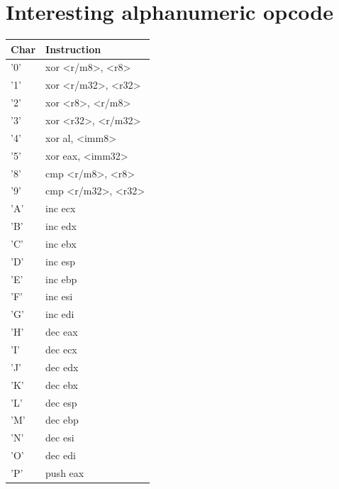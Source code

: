 \documentclass[14pt]{article}
\begin{document}
\section{Interesting alphanumeric opcode}
\center
\begin{tabular}{l|l|}
    Char & Instruction\\
    \hline
    '0' & xor <r/m8>, <r8>\\
    '1' & xor <r/m32>, <r32>\\
    '2' & xor <r8>, <r/m8>\\
    '3' & xor <r32>, <r/m32>\\
    '4' & xor al, <imm8>\\
    '5' & xor eax, <imm32>\\
    '8' & cmp <r/m8>, <r8>\\
    '9' & cmp <r/m32>, <r32>\\
    'A' & inc ecx\\
    'B' & inc edx\\
    'C' & inc ebx\\
    'D' & inc esp\\
    'E' & inc ebp\\
    'F' & inc esi\\
    'G' & inc edi\\
    'H' & dec eax\\
    'I' & dec ecx\\
    'J' & dec edx\\
    'K' & dec ebx\\
    'L' & dec esp\\
    'M' & dec ebp\\
    'N' & dec esi\\
    'O' & dec edi\\
    'P' & push eax\\
\end{tabular}
\quad
\end{document}
